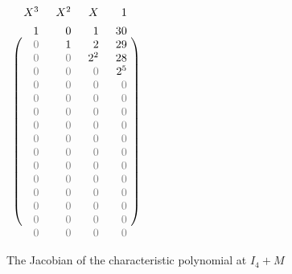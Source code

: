 \documentclass[11pt]{article}
\numberwithin{equation}{section}
\numberwithin{figure}{section}
\theoremstyle{definition}
\begin{document}
\begin{figure}
{$\begin{array}{c@{}r@{\hspace{1.5em}}r@{\hspace{1.5em}}r@{\hspace{1.5em}}r@{\hspace{0.5ex}}c}
& X^3 & X^2 & X & 1 \\
\rule[3ex]{0pt}{\baselineskip}
\raisebox{0.2ex}{\multirow{16}{*}{$\left(\parbox[c][39ex]{0cm}{}\right.$}}
& 1 & 0 & 1 & 30 &
\raisebox{0.2ex}{\multirow{16}{*}{$\left.\parbox[c][39ex]{0cm}{}\right)$}} \\
&{\color{black!50} 0} & 1 & 2 & 29 \\
&{\color{black!50} 0} & {\color{black!50} 0} & 2^2 & 28 \\
&{\color{black!50} 0} & {\color{black!50} 0} & {\color{black!50} 0} & 2^5 \\
&{\color{black!50} 0} & {\color{black!50} 0} & {\color{black!50} 0} & {\color{black!50} 0} \\
&{\color{black!50} 0} & {\color{black!50} 0} & {\color{black!50} 0} & {\color{black!50} 0} \\
&{\color{black!50} 0} & {\color{black!50} 0} & {\color{black!50} 0} & {\color{black!50} 0} \\
&{\color{black!50} 0} & {\color{black!50} 0} & {\color{black!50} 0} & {\color{black!50} 0} \\
&{\color{black!50} 0} & {\color{black!50} 0} & {\color{black!50} 0} & {\color{black!50} 0} \\
&{\color{black!50} 0} & {\color{black!50} 0} & {\color{black!50} 0} & {\color{black!50} 0} \\
&{\color{black!50} 0} & {\color{black!50} 0} & {\color{black!50} 0} & {\color{black!50} 0} \\
&{\color{black!50} 0} & {\color{black!50} 0} & {\color{black!50} 0} & {\color{black!50} 0} \\
&{\color{black!50} 0} & {\color{black!50} 0} & {\color{black!50} 0} & {\color{black!50} 0} \\
&{\color{black!50} 0} & {\color{black!50} 0} & {\color{black!50} 0} & {\color{black!50} 0} \\
&{\color{black!50} 0} & {\color{black!50} 0} & {\color{black!50} 0} & {\color{black!50} 0} \\
&{\color{black!50} 0} & {\color{black!50} 0} & {\color{black!50} 0} & {\color{black!50} 0} 
\end{array}$}
\hfill\null

\caption{The Jacobian of the characteristic polynomial at $I_4{+}M$}
\label{fig:jaccharpoly2}
\end{figure}
\end{document}
